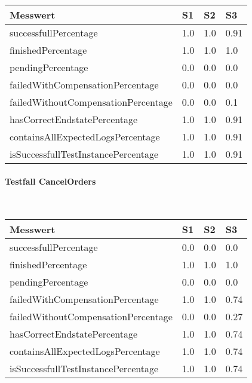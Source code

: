 \begin{center}
	\fontsize{9}{12}\selectfont
	\begin{longtable}[h]{|p{5cm}|p{1cm}|p{1cm}|p{1cm}|}
		\hline
		Messwert & S1 & S2 & S3 \\ \hline
		\endhead
		\endfoot
		successfull\-Percentage & 1.0 & 1.0 & 0.91 \\ \hline
		finished\-Percentage & 1.0 & 1.0 & 1.0 \\ \hline
		pending\-Percentage & 0.0 & 0.0 & 0.0 \\ \hline
		failedWithCompensation\-Percentage & 0.0 & 0.0 & 0.0 \\ \hline
		failedWithoutCompensation\-Percentage & 0.0 & 0.0 & 0.1 \\ \hline
		hasCorrectEndstate\-Percentage & 1.0 & 1.0 & 0.91 \\ \hline
		containsAllExpectedLogs\-Percentage & 1.0 & 1.0 & 0.91 \\ \hline
		isSuccessfullTestInstance\-Percentage & 1.0 & 1.0 & 0.91 \\ \hline
	\end{longtable}
\end{center}
\FloatBarrier

\paragraph*{Testfall CancelOrders} \mbox{}\\

\begin{center}
	\fontsize{9}{12}\selectfont
	\begin{longtable}[h]{|p{5cm}|p{1cm}|p{1cm}|p{1cm}|}
		\hline
		Messwert & S1 & S2 & S3 \\ \hline
		\endhead
		\endfoot
		successfull\-Percentage & 0.0 & 0.0 & 0.0 \\ \hline
		finished\-Percentage & 1.0 & 1.0 & 1.0 \\ \hline
		pending\-Percentage & 0.0 & 0.0 & 0.0 \\ \hline
		failedWithCompensation\-Percentage & 1.0 & 1.0 & 0.74 \\ \hline
		failedWithoutCompensation\-Percentage & 0.0 & 0.0 & 0.27 \\ \hline
		hasCorrectEndstate\-Percentage & 1.0 & 1.0 & 0.74 \\ \hline
		containsAllExpectedLogs\-Percentage & 1.0 & 1.0 & 0.74 \\ \hline
		isSuccessfullTestInstance\-Percentage & 1.0 & 1.0 & 0.74 \\ \hline
	\end{longtable}
\end{center}
\FloatBarrier

